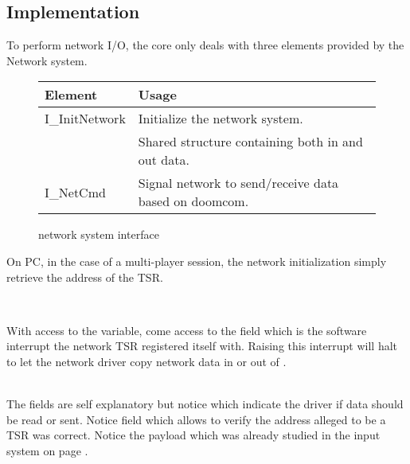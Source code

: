 \subsection{Implementation}
To perform network I/O, the core only deals with three elements provided by the Network system.\\
\par
 \begin{figure}[H]
\centering  
\begin{tabularx}{\textwidth}{ L{0.6}  L{1.4}}
  \toprule
  \textbf{Element} &  \textbf{Usage}\\

  \toprule 
   I\_InitNetwork & Initialize the network system.\\
    & Shared structure containing both in and out data.\\
   I\_NetCmd & Signal network to send/receive data based on doomcom.\\
   \toprule
\end{tabularx}
\caption{\doom network system interface}
\end{figure}



On PC, in the case of a multi-player session, the network initialization simply retrieve the address of the TSR.\\
\par
{}\\
\par
With access to the  variable, come access to the field  which is the software interrupt the network TSR registered itself with. Raising this interrupt will halt \doom{} to let the network driver copy network data in or out of .\\



 \label{doomcom_t.c} \\
\par
The fields are self explanatory but notice  which indicate the driver if data should be read or sent. Notice field  which allows \doom{} to verify the address alleged to be a TSR was correct. Notice the  payload which was already studied in the input system on page \pageref{cmd_t_type}.




